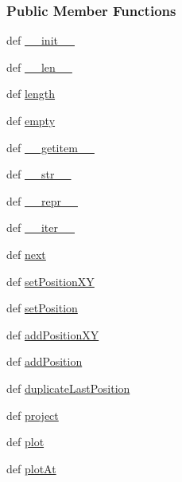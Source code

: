 \subsubsection*{Public Member Functions}
\begin{DoxyCompactItemize}
\item 
def \hyperlink{classmoving_1_1Trajectory_ac062f2cea5d93f39cac395dec6876758}{\-\_\-\-\_\-init\-\_\-\-\_\-}
\item 
def \hyperlink{classmoving_1_1Trajectory_ad39b573af44249fde020b1a1b71b0a4a}{\-\_\-\-\_\-len\-\_\-\-\_\-}
\item 
def \hyperlink{classmoving_1_1Trajectory_ac77fe3b1f6d8c03b30ff11f17480e981}{length}
\item 
def \hyperlink{classmoving_1_1Trajectory_a8a4d9ac57931a1fe479903e10162012a}{empty}
\item 
def \hyperlink{classmoving_1_1Trajectory_a286345cb4b1cf708623a62de33b15bb8}{\-\_\-\-\_\-getitem\-\_\-\-\_\-}
\item 
def \hyperlink{classmoving_1_1Trajectory_ad01d8a76eac707efcd8992f265447390}{\-\_\-\-\_\-str\-\_\-\-\_\-}
\item 
def \hyperlink{classmoving_1_1Trajectory_ad80c18b8ffea510c498e59231b4a4cea}{\-\_\-\-\_\-repr\-\_\-\-\_\-}
\item 
def \hyperlink{classmoving_1_1Trajectory_af3ba93e1cb3aaffbb8a0d310c0767fd5}{\-\_\-\-\_\-iter\-\_\-\-\_\-}
\item 
def \hyperlink{classmoving_1_1Trajectory_a78fe8d32fd59dc1633a3b70ac06418c5}{next}
\item 
def \hyperlink{classmoving_1_1Trajectory_afc025db1cdc139735f5d3cda97d731d8}{set\-Position\-X\-Y}
\item 
def \hyperlink{classmoving_1_1Trajectory_aa7dc9ed701689bdbc2dd0e46411b5a6a}{set\-Position}
\item 
def \hyperlink{classmoving_1_1Trajectory_aaccbb53089ea7f1ea138cec904e6f9e4}{add\-Position\-X\-Y}
\item 
def \hyperlink{classmoving_1_1Trajectory_a315478ba25d40b6d3c2391bd573f400a}{add\-Position}
\item 
def \hyperlink{classmoving_1_1Trajectory_aeaaa88f47bd9d8c8636d708ca7f7378e}{duplicate\-Last\-Position}
\item 
def \hyperlink{classmoving_1_1Trajectory_af04fb5fe3aa065eae93c9ceb35678a74}{project}
\item 
def \hyperlink{classmoving_1_1Trajectory_a9f5fc528157a8f067c1a34ee83c917dc}{plot}
\item 
def \hyperlink{classmoving_1_1Trajectory_a0e1aecd4f682ce2874f4cab12748c2b5}{plot\-At}

\end{DoxyCompactItemize}
